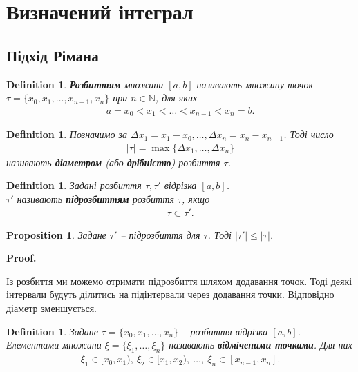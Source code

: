 \documentclass[a4paper, 10pt]{article}
\makeatletter
\theoremstyle{theoremdd}
\theoremstyle{theoremdd}
\theoremstyle{theoremdd}
\newtheorem{definition}[theorem]{Definition}
\theoremstyle{theoremdd}
\theoremstyle{theoremdd}
\theoremstyle{theoremdd}
\newtheorem{proposition}[theorem]{Proposition}
\theoremstyle{theoremdd}
\theoremstyle{theoremdd}
\theoremstyle{theoremdd}
\renewenvironment{proof}[1][Proof.\\]{\par
\pushQED{\hfill \qed}%
\normalfont \topsep6\p@\@plus6\p@\relax
\trivlist
\item\relax
{\bfseries
#1\@addpunct{.}}\hspace\labelsep\ignorespaces
}{%
\popQED\endtrivlist\@endpefalse
}
\makeatother
\begin{document}
\section{Визначений інтеграл}
\subsection{Підхід Рімана}
\begin{definition}
\textbf{Розбиттям} множини $[a,b]$ називають множину точок $\tau = \{x_0,x_1,\dots,x_{n-1},x_n\}$ при $n \in \mathbb{N}$, для яких
\begin{align*}
a = x_0 < x_1 < \dots < x_{n-1} < x_{n} = b.
\end{align*}
\end{definition}

\begin{definition}
Позначимо за $\Delta x_1 = x_1 - x_0, \dots, \Delta x_n = x_{n} - x_{n-1}$. Тоді число
\begin{align*}
|\tau| = \max\{\Delta x_1,\dots, \Delta x_n\}
\end{align*}
називають \textbf{діаметром} (або \textbf{дрібністю}) розбиття $\tau$.
\end{definition}

\begin{definition}
Задані розбиття $\tau, \tau'$ відрізка $[a,b]$.\\
$\tau'$ називають \textbf{підрозбиттям} розбиття $\tau$, якщо
\begin{align*}
\tau \subset \tau'.
\end{align*}
\end{definition}

\begin{proposition}
Задане $\tau'$ -- підрозбиття для $\tau$. Тоді $|\tau'| \leq |\tau|$.
\end{proposition}

\begin{proof}
Із розбиття ми можемо отримати підрозбиття шляхом додавання точок. Тоді деякі інтервали будуть ділитись на підінтервали через додавання точки. Відповідно діаметр зменшується.
\end{proof}

\begin{definition}
Задане $\tau = \{x_0,x_1,\dots,x_n\}$ -- розбиття відрізка $[a,b]$.\\
Елементами множини $\xi = \{\xi_1, \dots, \xi_n \}$ називають \textbf{відміченими точками}. Для них
\begin{align*}
\xi_1 \in [x_0,x_1),\ \xi_2 \in [x_1,x_2),\ \dots,\ \xi_n \in [x_{n-1}, x_n].
\end{align*}
\end{definition}
\end{document}
